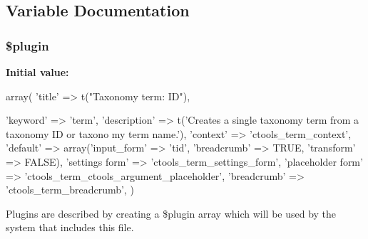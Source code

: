 \subsection{Variable Documentation}
\hypertarget{arguments_2term_8inc_ada8a7130088351710bb02ed622d6bf65}{
\subsubsection[{\$plugin}]{\setlength{\rightskip}{0pt plus 5cm}\$plugin}}
\label{arguments_2term_8inc_ada8a7130088351710bb02ed622d6bf65}
{\bfseries Initial value:}
\begin{DoxyCode}
 array(
  'title' => t("Taxonomy term: ID"),
  
  'keyword' => 'term',
  'description' => t('Creates a single taxonomy term from a taxonomy ID or taxono
      my term name.'),
  'context' => 'ctools_term_context',
  'default' => array('input_form' => 'tid', 'breadcrumb' => TRUE, 'transform' => 
      FALSE),
  'settings form' => 'ctools_term_settings_form',
  'placeholder form' => 'ctools_term_ctools_argument_placeholder',
  'breadcrumb' => 'ctools_term_breadcrumb',
)
\end{DoxyCode}
Plugins are described by creating a \$plugin array which will be used by the system that includes this file. 